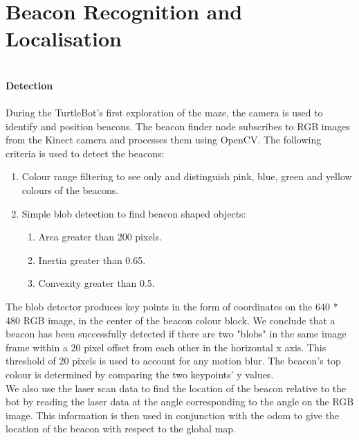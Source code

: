 \documentclass[titlepage,12pt,a4paper]{article}
\begin{document}
\pagebreak


\section*{Beacon Recognition and Localisation}

\large{\textbf{\\Detection}} \\
\normalsize
\\
During the TurtleBot's first exploration of the maze, the camera is used to identify and position beacons. The beacon finder node subscribes to RGB images from the Kinect camera and processes them using OpenCV. The following criteria is used to detect the beacons:

    \begin{enumerate}
        \item Colour range filtering to see only and distinguish pink, blue, green and yellow colours of the beacons.
        \item Simple blob detection to find beacon shaped objects:
        \begin{enumerate}
            \item Area greater than 200 pixels.
            \item Inertia greater than 0.65.
            \item Convexity greater than 0.5.
        \end{enumerate}
    \end{enumerate}

\noindent The blob detector produces key points in the form of coordinates on the 640 * 480 RGB image, in the center of the beacon colour block. We conclude that a beacon has been successfully detected if there are two "blobs" in the same image frame within a 20 pixel offset from each other in the horizontal x axis. This threshold of 20 pixels is used to account for any motion blur. The beacon's top colour is determined by comparing the two keypoints' y values.\\

\noindent We also use the laser scan data to find the location of the beacon relative to the bot by reading the laser data at the angle corresponding to the angle on the RGB image. This information is then used in conjunction with the odom to give the location of the beacon with respect to the global map. \\

\pagebreak
\end{document}
